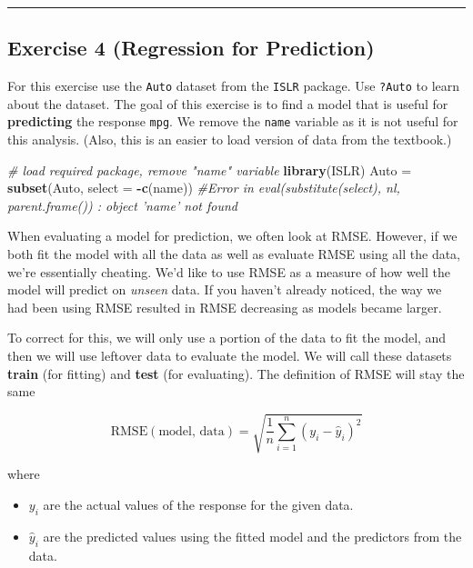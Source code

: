 \documentclass[
]{article}
\newenvironment{Shaded}{\begin{snugshade}}{\end{snugshade}}
\newcommand{\CommentTok}[1]{\textcolor[rgb]{0.56,0.35,0.01}{\textit{#1}}}
\newcommand{\DataTypeTok}[1]{\textcolor[rgb]{0.13,0.29,0.53}{#1}}
\newcommand{\KeywordTok}[1]{\textcolor[rgb]{0.13,0.29,0.53}{\textbf{#1}}}
\newcommand{\NormalTok}[1]{#1}
\newcommand{\OperatorTok}[1]{\textcolor[rgb]{0.81,0.36,0.00}{\textbf{#1}}}
\newcommand{\StringTok}[1]{\textcolor[rgb]{0.31,0.60,0.02}{#1}}
\providecommand{\tightlist}{%
  \setlength{\itemsep}{0pt}\setlength{\parskip}{0pt}}
\begin{document}
\begin{center}\rule{0.5\linewidth}{0.5pt}\end{center}

\hypertarget{exercise-4-regression-for-prediction}{%
\subsection{Exercise 4 (Regression for
Prediction)}\label{exercise-4-regression-for-prediction}}

For this exercise use the \texttt{Auto} dataset from the \texttt{ISLR}
package. Use \texttt{?Auto} to learn about the dataset. The goal of this
exercise is to find a model that is useful for \textbf{predicting} the
response \texttt{mpg}. We remove the \texttt{name} variable as it is not
useful for this analysis. (Also, this is an easier to load version of
data from the textbook.)

\begin{Shaded}
\begin{Highlighting}[]
\CommentTok{# load required package, remove "name" variable}
\KeywordTok{library}\NormalTok{(ISLR)}
\NormalTok{Auto =}\StringTok{ }\KeywordTok{subset}\NormalTok{(Auto, }\DataTypeTok{select =} \OperatorTok{-}\KeywordTok{c}\NormalTok{(name)) }\CommentTok{#Error in eval(substitute(select), nl, parent.frame()) : object 'name' not found}
\end{Highlighting}
\end{Shaded}

When evaluating a model for prediction, we often look at RMSE. However,
if we both fit the model with all the data as well as evaluate RMSE
using all the data, we're essentially cheating. We'd like to use RMSE as
a measure of how well the model will predict on \emph{unseen} data. If
you haven't already noticed, the way we had been using RMSE resulted in
RMSE decreasing as models became larger.

To correct for this, we will only use a portion of the data to fit the
model, and then we will use leftover data to evaluate the model. We will
call these datasets \textbf{train} (for fitting) and \textbf{test} (for
evaluating). The definition of RMSE will stay the same

\[
\text{RMSE}(\text{model, data}) = \sqrt{\frac{1}{n} \sum_{i = 1}^{n}(y_i - \hat{y}_i)^2}
\]

where

\begin{itemize}
\tightlist
\item
  \(y_i\) are the actual values of the response for the given data.
\item
  \(\hat{y}_i\) are the predicted values using the fitted model and the
  predictors from the data.
\end{itemize}
\end{document}
